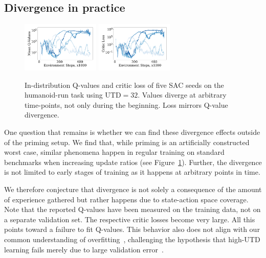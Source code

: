 \subsection{Divergence in practice} 
\label{sec:real}


\begin{figure}[b]
    \centering
    \includegraphics[width=0.33\textwidth]{figures/dissecting/priming/humanoid_Q.pdf}
    \includegraphics[width=0.33\textwidth]{figures/dissecting/priming/humanoid_loss.pdf}
    \caption{In-distribution Q-values and critic loss of five SAC seeds on the humanoid-run task using $\mathrm{UTD}=32$. Values diverge at arbitrary time-points, not only during the beginning. Loss mirrors Q-value divergence.}
    \label{fig:overestimation:humanoid_failure}
\end{figure}

One question that remains is whether we can find these divergence effects outside of the priming setup. We find that, while priming is an artificially constructed worst case, similar phenomena happen in regular training on standard benchmarks when increasing update ratios (see Figure~\ref{fig:overestimation:humanoid_failure}). Further, the divergence is not limited to early stages of training as it happens at arbitrary points in time.

We therefore conjecture that divergence is not solely a consequence of the amount of experience gathered but rather happens due to state-action space coverage. Note that the reported Q-values have been measured on the training data, not on a separate validation set. 
The respective critic losses become very large. All this points toward a failure to fit Q-values. This behavior also does not align with our common understanding of overfitting~\parencite{bishop2006pattern},  challenging the hypothesis that high-UTD learning fails merely due to large validation error~\parencite{li2023efficient}.

